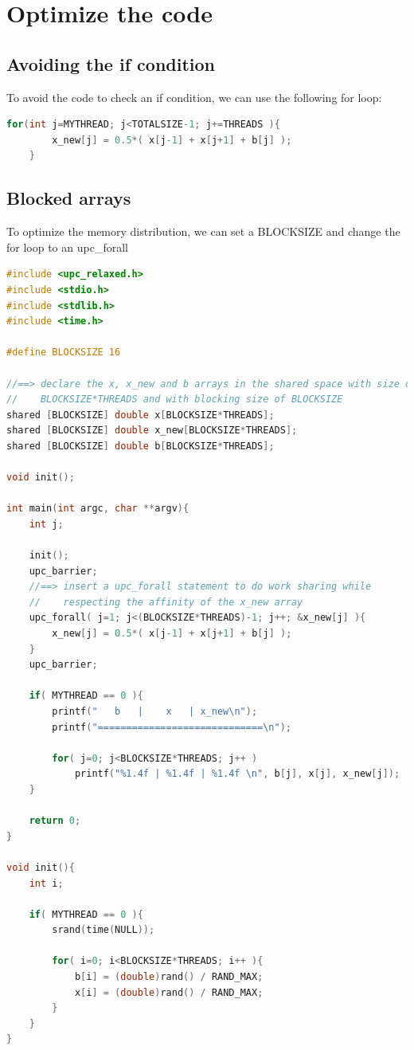 \documentclass{report}
\begin{document}
\section{Optimize the code}

\subsection{Avoiding the if condition}
To avoid the code to check an if condition, we can use the following for loop:

\begin{lstlisting}[language=C]
    for(int j=MYTHREAD; j<TOTALSIZE-1; j+=THREADS ){
        x_new[j] = 0.5*( x[j-1] + x[j+1] + b[j] );
    }
\end{lstlisting}

\subsection{Blocked arrays}

To optimize the memory distribution, we can set a BLOCKSIZE and change the for loop to an upc\_forall 

\begin{lstlisting}[language=C]
#include <upc_relaxed.h>
#include <stdio.h>
#include <stdlib.h>
#include <time.h>

#define BLOCKSIZE 16

//==> declare the x, x_new and b arrays in the shared space with size of 
//    BLOCKSIZE*THREADS and with blocking size of BLOCKSIZE
shared [BLOCKSIZE] double x[BLOCKSIZE*THREADS];
shared [BLOCKSIZE] double x_new[BLOCKSIZE*THREADS];
shared [BLOCKSIZE] double b[BLOCKSIZE*THREADS];

void init();

int main(int argc, char **argv){
    int j;

    init();
    upc_barrier;
    //==> insert a upc_forall statement to do work sharing while 
    //    respecting the affinity of the x_new array
    upc_forall( j=1; j<(BLOCKSIZE*THREADS)-1; j++; &x_new[j] ){
        x_new[j] = 0.5*( x[j-1] + x[j+1] + b[j] );
    }
    upc_barrier;

    if( MYTHREAD == 0 ){
        printf("   b   |    x   | x_new\n");
        printf("=============================\n");

        for( j=0; j<BLOCKSIZE*THREADS; j++ )
            printf("%1.4f | %1.4f | %1.4f \n", b[j], x[j], x_new[j]);
    }

    return 0;
}

void init(){
    int i;

    if( MYTHREAD == 0 ){
        srand(time(NULL));

        for( i=0; i<BLOCKSIZE*THREADS; i++ ){
            b[i] = (double)rand() / RAND_MAX;
            x[i] = (double)rand() / RAND_MAX;
        }
    }
}


\end{lstlisting}
\end{document}
